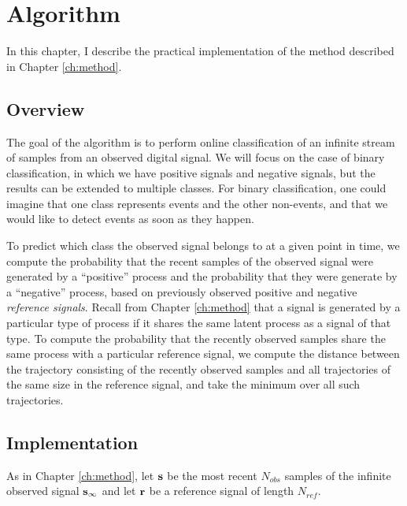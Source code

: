 \chapter{Algorithm}
\label{ch:alg}


In this chapter, I describe the practical implementation of the method described
in Chapter \ref{ch:method}.

\section{Overview}

The goal of the algorithm is to perform online classification of an infinite
stream of samples from an observed digital signal. We will focus on the case of
binary classification, in which we have positive signals and negative signals,
but the results can be extended to multiple classes.  For binary classification,
one could imagine that one class represents events and the other non-events, and
that we would like to detect events as soon as they happen.

To predict which class the observed signal belongs to at a given point in time,
we compute the probability that the recent samples of the observed signal were
generated by a ``positive'' process and the probability that they were generate
by a ``negative'' process, based on previously observed positive and negative
{\em reference signals}. Recall from Chapter \ref{ch:method} that a signal is
generated by a particular type of process if it shares the same latent process
as a signal of that type. To compute the probability that the recently observed
samples share the same process with a particular reference signal, we compute
the distance between the trajectory consisting of the recently observed samples
and all trajectories of the same size in the reference signal, and take the
minimum over all such trajectories.


\section{Implementation}

As in Chapter \ref{ch:method}, let $\mathbf s$ be the most recent $N_{obs}$ samples of the
infinite observed signal $\mathbf s_{\infty}$ and let $\mathbf r$ be a reference signal
of length $N_{ref}$.

